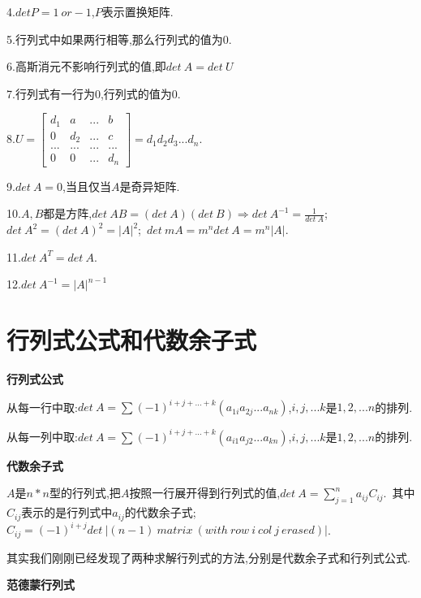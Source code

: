 \documentclass[oneside]{book}
\begin{document}
	4.$det P=1\ or -1$,$P$表示置换矩阵.
	
	5.行列式中如果两行相等,那么行列式的值为0.
	
	6.高斯消元不影响行列式的值,即$det\ A=det\ U$
	
	7.行列式有一行为0,行列式的值为0.
	
	8.$U=\left[\begin{array}{cccc}
		d_{1}&a&...&b\\0&d_{2}&...&c\\...&...&...&...\\0&0&...&d_{n}
	\end{array}\right]=d_{1}d_{2}d_{3}...d_{n}$.

	9.$det\ A=0$,当且仅当$A$是奇异矩阵.
	
	10.$A,B$都是方阵,$det\ AB=(det\ A)(det\ B)\Rightarrow det\ A^{-1}=\frac{1}{det\ A}$;\ $det\ A^{2}=(det\ A)^{2}=|A|^{2}$;\ $det\ mA=m^{n}det\ A=m^{n}|A|$.
	
	11.$det\ A^{T}=det\ A$.
	
	12.$det\ A^{-1}=|A|^{n-1}$
	
	\chapter{行列式公式和代数余子式}
	\textbf{行列式公式}
	
	从每一行中取:$det\ A=\sum (-1)^{i+j+...+k}(a_{1i}a_{2j}...a_{nk})$,$i,j,...k$是$1,2,...n$的排列.
	
	从每一列中取:$det\ A=\sum (-1)^{i+j+...+k}(a_{i1}a_{j2}...a_{kn})$,$i,j,...k$是$1,2,...n$的排列.
	
	\textbf{代数余子式}
	
	$A$是$n*n$型的行列式,把$A$按照一行展开得到行列式的值,$det\ A=\sum_{j=1}^{n}a_{ij}C_{ij}$.\ 其中$C_{ij}$表示的是行列式中$a_{ij}$的代数余子式;\ $C_{ij}=(-1)^{i+j}det\ |(n-1)\ matrix\ (with\ row\ i\ col\ j\ erased)|$.
	
	其实我们刚刚已经发现了两种求解行列式的方法,分别是代数余子式和行列式公式.
	
	\textbf{范德蒙行列式}
	
	
\end{document}

